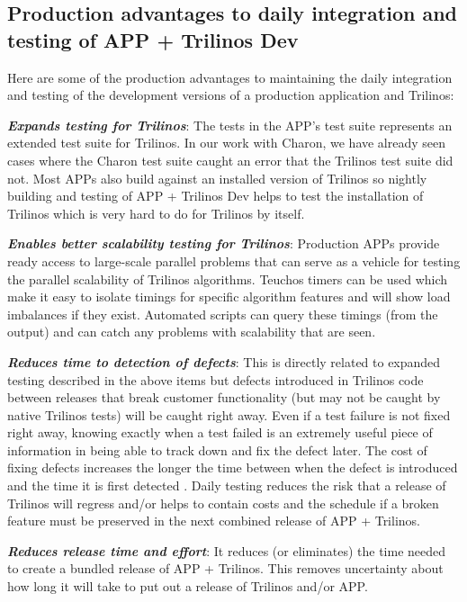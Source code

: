 \documentclass[pdf,ps2pdf,11pt]{SANDreport}
\begin{document}
%
{}\subsection{Production advantages to daily integration and testing of APP +
Trilinos Dev}
%

Here are some of the production advantages to maintaining the daily integration
and testing of the development versions of a production application and
Trilinos:

{}\textit{\textbf{Expands testing for Trilinos}}: The tests in the APP's test
suite represents an extended test suite for Trilinos.  In our work with
Charon, we have already seen cases where the Charon test suite caught an error
that the Trilinos test suite did not.  Most APPs also build against an
installed version of Trilinos so nightly building and testing of APP +
Trilinos Dev helps to test the installation of Trilinos which is very hard to
do for Trilinos by itself.

{}\textit{\textbf{Enables better scalability testing for Trilinos}}:
Production APPs provide ready access to large-scale parallel problems that can
serve as a vehicle for testing the parallel scalability of Trilinos
algorithms.  Teuchos timers can be used which make it easy to isolate timings
for specific algorithm features and will show load imbalances if they exist.
Automated scripts can query these timings (from the output) and can catch any
problems with scalability that are seen.

{}\textit{\textbf{Reduces time to detection of defects}}: This is directly related
to expanded testing described in the above items but defects introduced in
Trilinos code between releases that break customer functionality (but may not
be caught by native Trilinos tests) will be caught right away.  Even if a test
failure is not fixed right away, knowing exactly when a test failed is an
extremely useful piece of information in being able to track down and fix the
defect later.  The cost of fixing defects increases the longer the time
between when the defect is introduced and the time it is first detected
{}\cite{book:code-complete-2}.  Daily testing reduces the risk that a release
of Trilinos will regress and/or helps to contain costs and the schedule if a
broken feature must be preserved in the next combined release of APP +
Trilinos.

{}\textit{\textbf{Reduces release time and effort}}: It reduces (or eliminates)
the time needed to create a bundled release of APP + Trilinos.  This removes
uncertainty about how long it will take to put out a release of Trilinos
and/or APP. 
\end{document}
